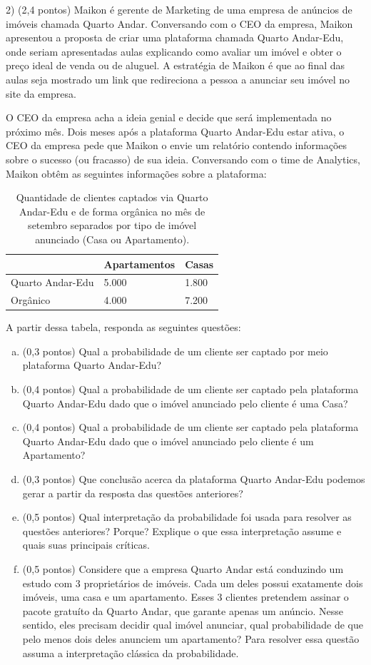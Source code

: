 \documentclass[12pt]{article}
\begin{document}
2) (2,4 pontos) Maikon é gerente de Marketing de uma empresa de anúncios de imóveis chamada Quarto Andar. Conversando com o CEO da empresa, Maikon apresentou
a proposta de criar uma plataforma chamada Quarto Andar-Edu, onde seriam apresentadas aulas explicando como avaliar um imóvel e obter o preço ideal de venda ou de aluguel. A estratégia de Maikon é 
que ao final das aulas seja mostrado um link que redireciona a pessoa a anunciar seu imóvel no site da empresa. 


O CEO da empresa acha a ideia genial e decide que será implementada no próximo mês. Dois meses após a plataforma  Quarto Andar-Edu estar ativa, o CEO da empresa 
pede que Maikon o envie um relatório contendo informações sobre o sucesso (ou fracasso) de sua ideia. Conversando com o time de Analytics, Maikon obtêm 
as seguintes informações sobre a plataforma:

\begin{table}[H]
\centering
\begin{tabular}{lll}
\hline
                  & Apartamentos & Casas \\ \hline
Quarto Andar-Edu & 5.000        & 1.800 \\
Orgânico          & 4.000        & 7.200 \\ \hline
\end{tabular}
\caption{Quantidade de clientes captados via Quarto Andar-Edu e de forma orgânica no mês de setembro separados por tipo de imóvel anunciado (Casa ou Apartamento).}
\end{table}

A partir dessa tabela, responda as seguintes questões:

\begin{enumerate}[a)]
    \item (0,3 pontos) Qual a probabilidade de um cliente ser captado por meio plataforma Quarto Andar-Edu?
    \item (0,4 pontos) Qual a probabilidade de um cliente ser captado pela plataforma Quarto Andar-Edu dado que o imóvel anunciado pelo cliente é uma Casa?
    \item (0,4 pontos) Qual a probabilidade de um cliente ser captado pela plataforma Quarto Andar-Edu dado que o imóvel anunciado pelo cliente é um Apartamento?
    \item (0,3 pontos) Que conclusão acerca da plataforma Quarto Andar-Edu podemos gerar a partir da resposta das questões anteriores?
    \item (0,5 pontos) Qual interpretação da probabilidade foi usada para resolver as questões anteriores? Porque?
     Explique o que essa interpretação assume e quais suas principais críticas.
    \item (0,5 pontos) Considere que a empresa Quarto Andar está conduzindo um estudo com 3 proprietários de imóveis. Cada um deles possui exatamente
    dois imóveis, uma casa e um apartamento. Esses 3 clientes pretendem assinar o pacote gratuíto da Quarto Andar, que garante apenas um anúncio.
    Nesse sentido, eles precisam decidir qual imóvel anunciar, qual probabilidade de que pelo menos dois 
    deles anunciem um apartamento? Para resolver essa questão assuma a interpretação clássica da probabilidade. 
\end{enumerate}
\end{document}
